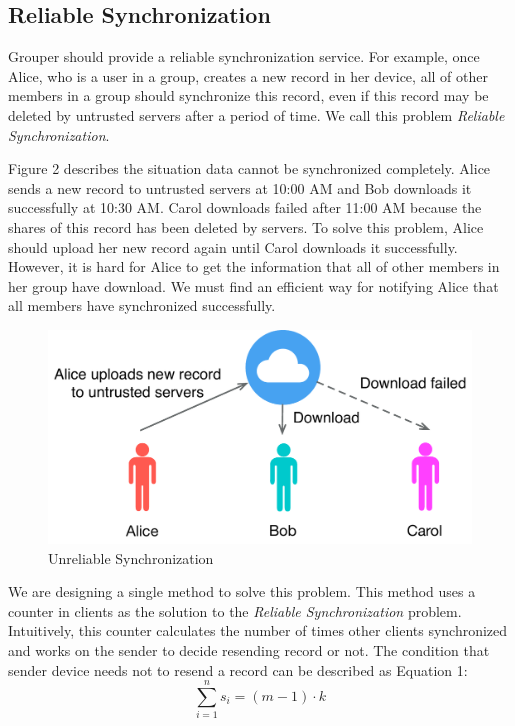 \documentclass[twocolumn,10pt]{article}
\begin{document}
\subsection{Reliable Synchronization}
Grouper should provide a reliable synchronization service. For example, once Alice, who is a user in a group, creates a new record in her device, all of other members in a group should synchronize this record, even if this record may be deleted by untrusted servers after a period of time. We call this problem \emph{Reliable Synchronization}.

Figure 2 describes the situation data cannot be synchronized completely. Alice sends a new record to untrusted servers at 10:00 AM and Bob downloads it successfully at 10:30 AM. Carol downloads failed after 11:00 AM because the shares of this record has been deleted by servers. To solve this problem, Alice should upload her new record again until Carol downloads it successfully. However, it is hard for Alice to get the information that all of other members in her group have download. We must find an efficient way for notifying Alice that all members have synchronized successfully.

\begin{figure}[t]
	\centering
	\includegraphics[scale=0.35]{unreliabe_sync}
	\caption{Unreliable Synchronization}
\end{figure}

We are designing a single method to solve this problem. This method uses a counter in clients as the solution to the \emph{Reliable Synchronization} problem. Intuitively, this counter calculates the number of times other clients synchronized and works on the sender to decide resending record or not. The condition that sender device needs not to resend a record can be described as Equation 1:
\begin{equation}
\sum_{i=1}^{n}s_{i}=(m-1)\cdot k
\end{equation}
\end{document}
